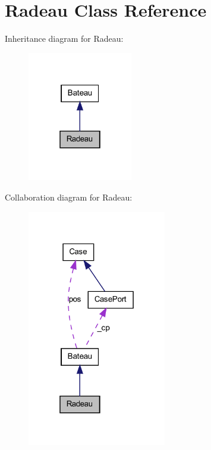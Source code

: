 \hypertarget{class_radeau}{
\section{Radeau Class Reference}
\label{class_radeau}
}


Inheritance diagram for Radeau:
\nopagebreak
\begin{figure}[H]
\begin{center}
\leavevmode
\includegraphics[width=130pt]{class_radeau__inherit__graph}
\end{center}
\end{figure}


Collaboration diagram for Radeau:
\nopagebreak
\begin{figure}[H]
\begin{center}
\leavevmode
\includegraphics[width=172pt]{class_radeau__coll__graph}
\end{center}
\end{figure}
